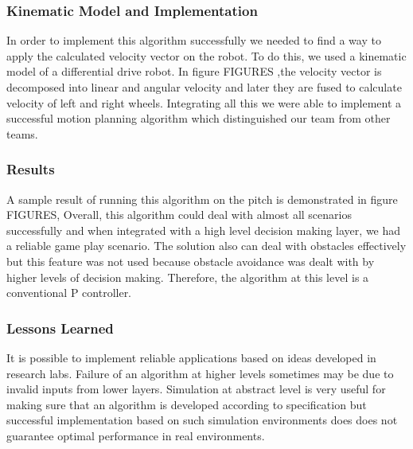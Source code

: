 \subsubsection{Kinematic Model and Implementation}
In order to implement this algorithm successfully we needed to find a way to apply the calculated velocity vector on the robot. To do this, we used a kinematic model of a differential drive robot. In figure FIGURES   ,the velocity vector is decomposed into linear and angular velocity and later they are fused to calculate velocity of left and right wheels.
Integrating all this we were able to implement a successful motion planning algorithm which distinguished our team from other teams.\linebreak

\subsubsection{Results}
A sample result of running this algorithm on the pitch is demonstrated in figure FIGURES, Overall, this algorithm could deal with almost all scenarios successfully and when integrated with a high level decision making layer, we had a reliable game play scenario. 
The solution also can deal with obstacles effectively but this feature was not used because obstacle avoidance was dealt with by higher levels of decision making. Therefore, the algorithm at this level is a conventional P controller.\linebreak

\subsubsection{Lessons Learned}
It is possible to implement reliable applications based on ideas developed in research labs. 
Failure of an algorithm at higher levels sometimes may be due to invalid inputs from lower layers.
Simulation at abstract level is very useful for making sure that an algorithm is developed according to specification but successful implementation based on such simulation environments does does not guarantee optimal performance in real environments.
